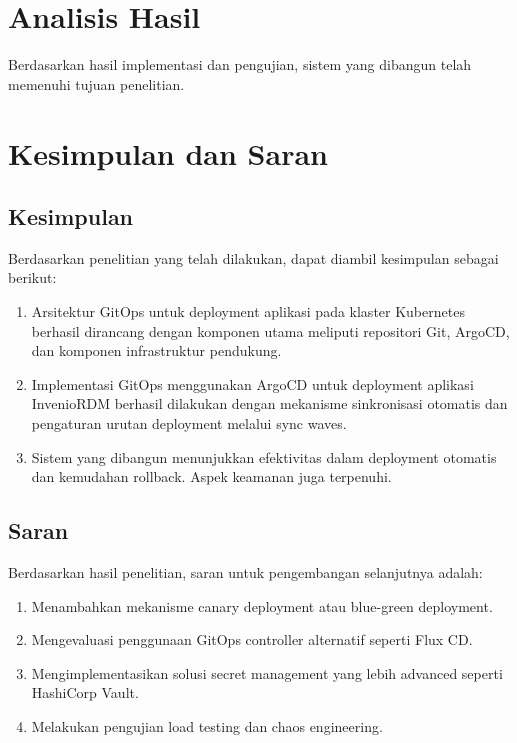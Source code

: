\section{Analisis Hasil}

Berdasarkan hasil implementasi dan pengujian, sistem yang dibangun telah memenuhi tujuan penelitian.

\section{Kesimpulan dan Saran}

\subsection{Kesimpulan}

Berdasarkan penelitian yang telah dilakukan, dapat diambil kesimpulan sebagai berikut:

\begin{enumerate}
    \item Arsitektur GitOps untuk deployment aplikasi pada klaster Kubernetes berhasil dirancang dengan komponen utama meliputi repositori Git, ArgoCD, dan komponen infrastruktur pendukung.
    \item Implementasi GitOps menggunakan ArgoCD untuk deployment aplikasi InvenioRDM berhasil dilakukan dengan mekanisme sinkronisasi otomatis dan pengaturan urutan deployment melalui sync waves.
    \item Sistem yang dibangun menunjukkan efektivitas dalam deployment otomatis dan kemudahan rollback. Aspek keamanan juga terpenuhi.
\end{enumerate}

\subsection{Saran}

Berdasarkan hasil penelitian, saran untuk pengembangan selanjutnya adalah:

\begin{enumerate}
    \item Menambahkan mekanisme canary deployment atau blue-green deployment.
    \item Mengevaluasi penggunaan GitOps controller alternatif seperti Flux CD.
    \item Mengimplementasikan solusi secret management yang lebih advanced seperti HashiCorp Vault.
    \item Melakukan pengujian load testing dan chaos engineering.
\end{enumerate}

